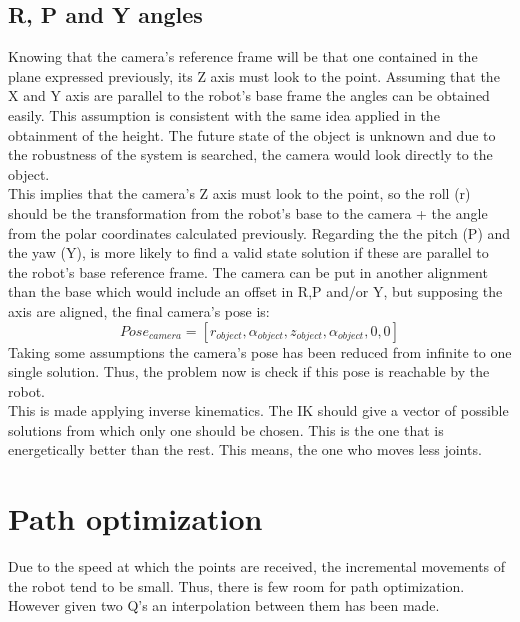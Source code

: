 \subsection{R, P and Y angles} %
\label{sub:r_p_and_y_angles}
Knowing that the camera's reference frame will be that one contained in the plane expressed previously, its Z axis must look to the point. 
Assuming that the X and Y axis are parallel to the robot's base frame the angles can be obtained easily.
This assumption is consistent with the same idea applied in the obtainment of the height. 
The future state of the object is unknown and due to the robustness of the system is searched, the camera would look directly to the object.\\

This implies that the camera's Z axis must look to the point, so the roll (r) should be the transformation from the robot's base to the camera + the angle from the polar coordinates calculated previously.
Regarding the the pitch (P) and the yaw (Y), is more likely to find a valid state solution if these are parallel to the robot's base reference frame. 
The camera can be put in another alignment than the base which would include an offset in R,P and/or Y, but supposing the axis are aligned, the final camera's pose is:
	\begin{equation}
		\label{eq:cameras_pose}
		Pose_{camera} = [r_{object},\alpha_{object},z_{object},\alpha_{object},0,0]
	\end{equation}
Taking some assumptions the camera's pose has been reduced from infinite to one single solution. Thus, the problem now is check if this pose is reachable by the robot.\\

This is made applying inverse kinematics. The IK should give a vector of possible solutions from which only one should be chosen. This is the one that is energetically better than the rest. This means, the one who moves less joints.


\section{Path optimization} %
\label{sec:path_optimization}
Due to the speed at which the points are received, the incremental movements of the robot tend to be small. Thus, there is few room for path optimization. However given two Q's an interpolation between them has been made.\\

